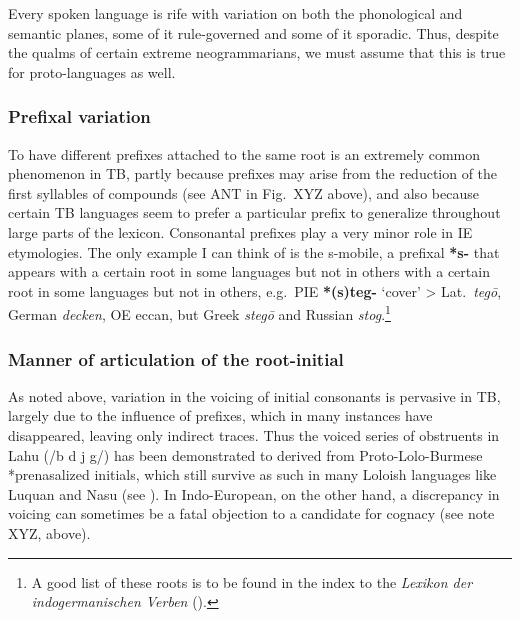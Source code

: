 Every spoken language is rife with variation on both the phonological and semantic planes, some of it rule-governed and some of it sporadic. Thus, despite the qualms of certain extreme neogrammarians, we must assume that this is true for proto-languages as well.

\subsubsection{Prefixal variation}

To have different prefixes attached to the same root is an extremely common phenomenon in TB, 
partly because prefixes may arise from the reduction of the first syllables of compounds (see ANT in Fig.~XYZ above), and also because certain TB languages seem to prefer a particular prefix to generalize throughout large parts of the lexicon.  Consonantal prefixes play a very minor role in IE etymologies. The only example I can think of is the s-mobile, a prefixal \textbf{*s-} that appears with a certain root in some languages but not in others with a certain root in some languages but not in others, e.g.\ PIE \textbf{*(s)teg-} ‘cover’ > Lat.\ \textit{tegō}, German \textit{decken}, OE {{\th}eccan}, but Greek \textit{stegō} and Russian \textit{stog}.\footnote{A good list of these roots is to be found in the index to the \textit{Lexikon der indogermanischen Verben} (\citealt{HRMK-LIV}).}

\subsubsection{Manner of articulation of the root-initial}

As noted above, variation in the voicing of initial consonants is pervasive in TB, largely due to the influence of prefixes, which in many instances have disappeared, leaving only indirect traces. Thus the voiced series of obstruents in Lahu (/b d j g/) has been demonstrated to derived from Proto-Lolo-Burmese *prenasalized initials, which still survive as such in many Loloish languages like Luquan and Nasu (see \citealt{JAM-TSR}).
In Indo-European, on the other hand, a discrepancy in voicing can sometimes be a fatal objection to a candidate for cognacy (see note XYZ, above).



